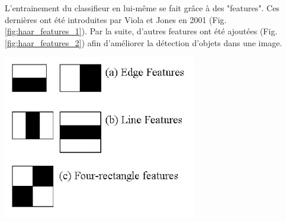 \documentclass[11pt]{article}
\begin{document}
L'entrainement du classifieur en lui-même se fait grâce à des "features". Ces dernières ont été introduites par Viola et Jones en 2001 (Fig. \ref{fig:haar_features_1}). Par la suite, d'autres features ont été ajoutées (Fig. \ref{fig:haar_features_2}) afin d'améliorer la détection d'objets dans une image.
\bigbreak \bigbreak

\begin{minipage}[t]{0.35\textwidth}
    \begin{center}
        \includegraphics[width=\textwidth]{images/haar_features.jpg}
        \label{fig:haar_features_1}
    \end{center}
\end{minipage}\hspace{1.5cm}
\end{document}
